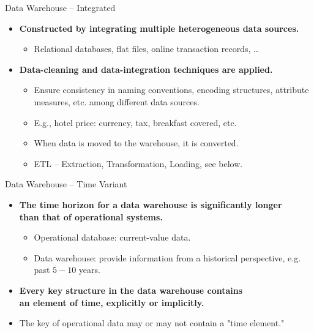 \begin{frame}{Data Warehouse -- Integrated}
  \begin{itemize}
  \item \textbf{Constructed by {\color{airforceblue}integrating multiple heterogeneous data sources}.}
    \begin{itemize}
    \item Relational databases, flat files, online transaction records, \ldots
    \end{itemize}
  \item \textbf{Data-cleaning and data-integration techniques are applied.}
    \begin{itemize}
    \item Ensure consistency in naming conventions, encoding structures, attribute measures, etc. among different data sources.
    \item E.g., hotel price: currency, tax, breakfast covered, etc.
    \item When data is moved to the warehouse, it is converted.
    \item ETL -- Extraction, Transformation, Loading, see below.
    \end{itemize}
  \end{itemize}
\end{frame}

\begin{frame}{Data Warehouse -- Time Variant}
  \begin{itemize}
  \item \textbf{The {\color{airforceblue}time horizon} for a data warehouse is {\color{airforceblue}significantly longer} \\
      than that of operational systems.}
    \begin{itemize}
    \item Operational database: current-value data.
    \item Data warehouse: provide information from a historical perspective, e.g. past $5-10$ years.
    \end{itemize}
  \item \textbf{Every key structure in the data warehouse contains \\
      an element of time, explicitly or implicitly.}
  \item The key of operational data may or may not contain a "time element."
  \end{itemize}
\end{frame}

